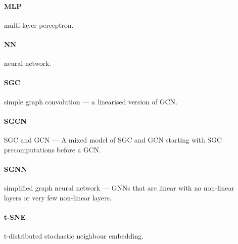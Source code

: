 \paragraph{MLP}
multi-layer perceptron.

\paragraph{NN}
neural network.

\paragraph{SGC}
simple graph convolution --- a linearised version of GCN.

\paragraph{SGCN}
SGC and GCN --- A mixed model of SGC and GCN starting with SGC precomputations before a GCN.

\paragraph{SGNN}
simplified graph neural network --- GNNs that are linear with no non-linear layers or very few non-linear layers.

\paragraph{t-SNE}
t-distributed stochastic neighbour embedding.

